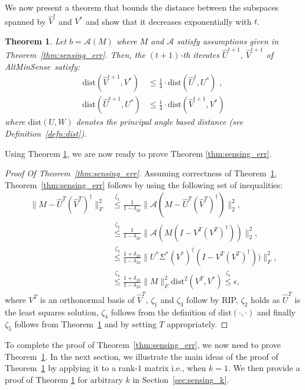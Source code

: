\documentclass[11pt]{article}
\theoremstyle{plain}
\newtheorem{theorem}{Theorem}[section]
\theoremstyle{definition}
\newcommand{\dist}{\mathrm{dist}}
\newcommand{\aff}{{\mathcal A}}
\newcommand{\as}{AltMinSense\ }
\begin{document}
We now present a theorem that bounds the distance between the subspaces spanned by $\widehat{V}^t$ and $V^*$ and show that it decreases exponentially with $t$.
\begin{theorem}\label{thm:sensing}
Let $b=\aff(M)$ where  $M$ and $\aff$ satisfy assumptions given in Theorem~\ref{thm:sensing_err}. Then, the $(t+1)$-th iterates $\widehat{U}^{t+1}$, $\widehat{V}^{t+1}$ of \as satisfy:
\begin{align*}
  \dist\left(\widehat{V}^{t+1},V^*\right) &\leq \frac{1}{4}\cdot\dist\left(\widehat{U}^{t}, U^*\right)  \mbox{ , } \\
  \dist\left(\widehat{U}^{t+1},U^*\right) &\leq \frac{1}{4}\cdot\dist\left(\widehat{V}^{t+1}, V^*\right)
\end{align*}
where %
$\dist\left(U, W\right)$ denotes the principal angle based distance (see Definition~\ref{defn:dist}).
\end{theorem}
Using Theorem \ref{thm:sensing}, we are now ready to prove Theorem \ref{thm:sensing_err}.
\begin{proof}[Proof Of Theorem~\ref{thm:sensing_err}]
Assuming correctness of Theorem~\ref{thm:sensing}, Theorem~\ref{thm:sensing_err} follows by using the following set of inequalities:
\begin{align*}
  \|M-\widehat{U}^T(\widehat{V}^T)^\dag\|_F^2&\stackrel{\zeta_1}{\leq} \frac{1}{1-\delta_{2k}}\|\aff(M-\widehat{U}^T(\widehat{V}^T)^\dag)\|_2^2,\\
&\stackrel{\zeta_2}{\leq} \frac{1}{1-\delta_{2k}}\|\aff(M(I-V^T(V^T)^\dag))\|_2^2,\\
&\stackrel{\zeta_3}{\leq} \frac{1+\delta_{2k}}{1-\delta_{2k}}\|U^*\Sigma^*(V^*)^\dag(I-V^T(V^T)^\dag))\|_F^2,\\
&\stackrel{\zeta_4}{\leq} \frac{1+\delta_{2k}}{1-\delta_{2k}} \|M\|_F^2\dist^2\left(V^T, V^*\right)\stackrel{\zeta_5}{\leq} \epsilon,
\end{align*}
where $V^T$ is an orthonormal basis of $\widehat{V}^T$, $\zeta_1$ and $\zeta_3$ follow by RIP, $\zeta_2$ holds as $\widehat{U}^T$ is the least squares solution,
$\zeta_4$ follows from the definition of $\dist(\cdot,\cdot)$ and finally $\zeta_5$ follows from Theorem~\ref{thm:sensing} and by setting $T$ appropriately.
\end{proof}
To complete the proof of Theorem~\ref{thm:sensing_err}, we now need to prove Theorem~\ref{thm:sensing}. In the next section, we illustrate the main ideas of the proof of Theorem~\ref{thm:sensing} by applying it to a rank-$1$ matrix i.e., when $k = 1$. We then provide a proof of Theorem \ref{thm:sensing} for arbitrary $k$ in Section~\ref{sec:sensing_k}.
\end{document}
